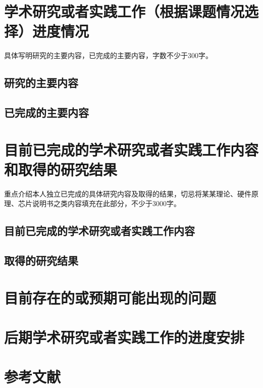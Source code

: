 \section{学术研究或者实践工作（根据课题情况选择）进度情况}
具体写明研究的主要内容，已完成的主要内容，字数不少于300字。

\subsection{研究的主要内容}

\subsection{已完成的主要内容}

\section{目前已完成的学术研究或者实践工作内容和取得的研究结果}
重点介绍本人独立已完成的具体研究内容及取得的结果，切忌将某某理论、硬件原理、芯片说明书之类内容填充在此部分，不少于3000字。

\subsection{目前已完成的学术研究或者实践工作内容}

\subsection{取得的研究结果}

\section{目前存在的或预期可能出现的问题}

\section{后期学术研究或者实践工作的进度安排}

\section{参考文献}



